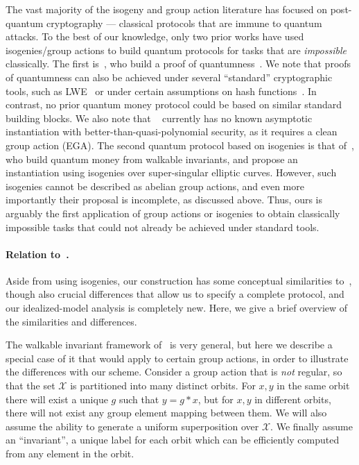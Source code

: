 \documentclass{article}\usepackage[a4paper,margin=20mm]{geometry}
\numberwithin{theorem}{section}
\numberwithin{equation}{section}
\newcommand{\Xs}{{\mathcal{X}}}
\begin{document}
The vast majority of the isogeny and group action literature has focused on post-quantum cryptography --- classical protocols that are immune to quantum attacks. To the best of our knowledge, only two prior works have used isogenies/group actions to build quantum protocols for tasks that are \emph{impossible} classically. The first is~\cite{TCC:AlaMalRah22}, who build a proof of quantumness~\cite{DBLP:journals/jacm/BrakerskiCMVV21}. We note that proofs of quantumness can also be achieved under several ``standard'' cryptographic tools, such as LWE~\cite{DBLP:journals/jacm/BrakerskiCMVV21} or under certain assumptions on hash functions~\cite{DBLP:journals/jacm/YamakawaZ24}. In contrast, no prior quantum money protocol could be based on similar standard building blocks. We also note that ~\cite{TCC:AlaMalRah22} currently has no known asymptotic instantiation with better-than-quasi-polynomial security, as it requires a clean group action (EGA). The second quantum protocol based on isogenies is that of~\cite{EC:LiuMonZha23}, who build quantum money from walkable invariants, and propose an instantiation using isogenies over super-singular elliptic curves. However, such isogenies cannot be described as abelian group actions, and even more importantly their proposal is incomplete, as discussed above. Thus, ours is arguably the first application of group actions or isogenies to obtain classically impossible tasks that could not already be achieved under standard tools.



\paragraph{Relation to~\cite{EC:LiuMonZha23}.} Aside from using isogenies, our construction has some conceptual similarities to~\cite{EC:LiuMonZha23}, though also crucial differences that allow us to specify a complete protocol, and our idealized-model analysis is completely new. Here, we give a brief overview of the similarities and differences.

The walkable invariant framework of~\cite{EC:LiuMonZha23} is very general, but here we describe a special case of it that would apply to certain group actions, in order to illustrate the differences with our scheme. Consider a group action that is \emph{not} regular, so that the set $\Xs$ is partitioned into many distinct orbits. For $x,y$ in the same orbit there will exist a unique $g$ such that $y=g*x$, but for $x,y$ in different orbits, there will not exist any group element mapping between them. We will also assume the ability to generate a uniform superposition over $\Xs$. We finally assume an ``invariant'', a unique label for each orbit which can be efficiently computed from any element in the orbit.
\end{document}
